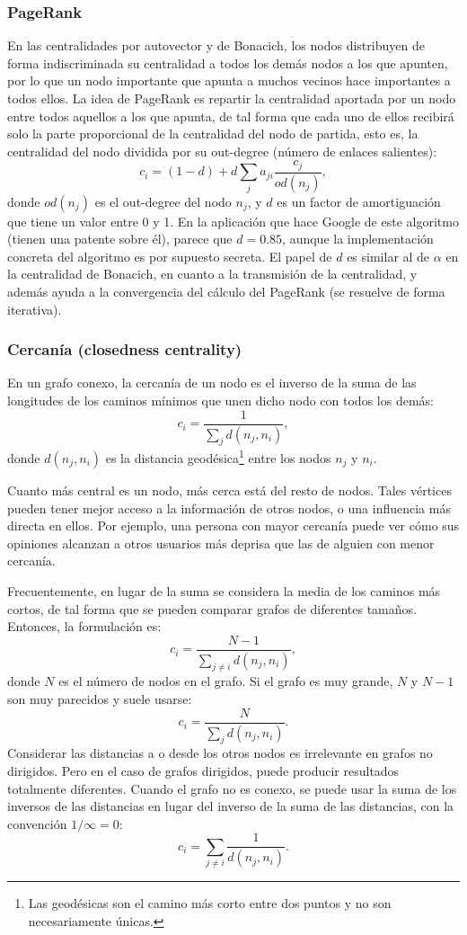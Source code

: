 \subsubsection{PageRank}
En las centralidades por autovector y de Bonacich, los nodos
distribuyen de forma indiscriminada su centralidad a todos los demás nodos a los que apunten, 
por lo que un nodo importante que apunta a muchos vecinos hace importantes a 
todos ellos. La idea de PageRank es repartir la centralidad aportada 
por un nodo entre todos aquellos a los que apunta, de tal forma que cada uno de ellos
recibirá solo la parte proporcional de la centralidad del nodo de partida, esto es,
la centralidad del nodo dividida por su out-degree (número de enlaces salientes):
$$c_i = (1-d) + d\sum_j a_{ji} \frac{c_j}{od(n_j)},$$
donde $od(n_j)$ es el out-degree del nodo $n_j$, y $d$ es un factor de amortiguación 
que tiene un valor entre 0 y 1. En la aplicación que hace Google de este algoritmo
(tienen una patente sobre él), parece que $d=0.85$, aunque la 
implementación concreta del algoritmo es por supuesto secreta. El papel de
$d$ es similar al de $\alpha$ en la centralidad de Bonacich, en
cuanto a la transmisión de la centralidad, y además ayuda a la convergencia
del cálculo del PageRank (se resuelve de forma iterativa).

\subsubsection{Cercanía (closedness centrality)}
En un grafo conexo, la cercanía 
de un nodo es el inverso de la suma de las longitudes
de los caminos mínimos que unen dicho nodo con todos los demás:
$$c_i=\frac {1}{\sum _{j}d(n_j,n_i)},$$
donde $d(n_j,n_i)$ es la distancia geodésica\footnote{Las geodésicas son el camino
más corto entre dos puntos y no son necesariamente únicas.} 
entre los nodos $n_j$ y $n_i$. 

Cuanto más central es un nodo,
más cerca está del resto de nodos. Tales vértices pueden tener mejor acceso
a la información de otros nodos, o una influencia más directa en ellos. Por ejemplo, una persona
con mayor cercanía puede ver cómo sus opiniones alcanzan a otros usuarios más deprisa que 
las de alguien con menor cercanía. 

Frecuentemente, en lugar de la suma se considera la media de los caminos más cortos, 
de tal forma que se pueden comparar grafos de diferentes tamaños. Entonces, la formulación es:
$$c_i=\frac {N-1}{\sum _{j\neq i}d(n_j,n_i)},$$
donde $N$ es el número de nodos en el grafo. Si el grafo es muy grande, 
$N$ y $N-1$ son muy parecidos y suele usarse:  
$$c_i=\frac {N}{\sum _{j}d(n_j,n_i)}.$$
Considerar las distancias a o desde los otros nodos es irrelevante en grafos no dirigidos.
Pero en el caso de grafos dirigidos, puede producir resultados totalmente diferentes.
Cuando el grafo no es conexo, se puede usar la suma de los inversos de las distancias
en lugar del inverso de la suma de las distancias, con la convención 
$1/\infty =0$:
$$c_i=\sum _{j\neq i}\frac {1}{d(n_j,n_i)}.$$

